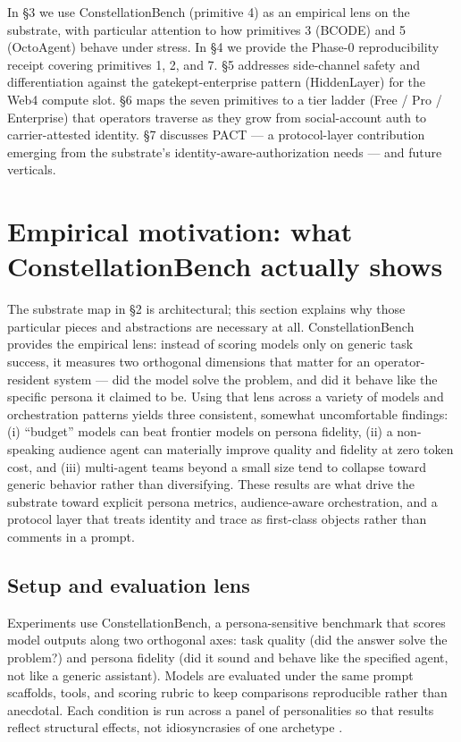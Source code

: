 \documentclass{article}
\begin{document}
In §3 we use ConstellationBench (primitive 4) as an empirical lens on
the substrate, with particular attention to how primitives 3 (BCODE) and
5 (OctoAgent) behave under stress. In §4 we provide the Phase-0
reproducibility receipt covering primitives 1, 2, and 7. §5 addresses
side-channel safety and differentiation against the gatekept-enterprise
pattern (HiddenLayer) for the Web4 compute slot. §6 maps the seven
primitives to a tier ladder (Free / Pro / Enterprise) that operators
traverse as they grow from social-account auth to carrier-attested
identity. §7 discusses PACT --- a protocol-layer contribution emerging
from the substrate's identity-aware-authorization needs --- and future
verticals.

\section{Empirical motivation: what ConstellationBench actually
shows}\label{empirical-motivation-what-constellationbench-actually-shows}

The substrate map in §2 is architectural; this section explains why
those particular pieces and abstractions are necessary at all.
ConstellationBench provides the empirical lens: instead of scoring
models only on generic task success, it measures two orthogonal
dimensions that matter for an operator-resident system --- did the model
solve the problem, and did it behave like the specific persona it
claimed to be. Using that lens across a variety of models and
orchestration patterns yields three consistent, somewhat uncomfortable
findings: (i) ``budget'' models can beat frontier models on persona
fidelity, (ii) a non-speaking audience agent can materially improve
quality and fidelity at zero token cost, and (iii) multi-agent teams
beyond a small size tend to collapse toward generic behavior rather than
diversifying. These results are what drive the substrate toward explicit
persona metrics, audience-aware orchestration, and a protocol layer that
treats identity and trace as first-class objects rather than comments in
a prompt.

\subsection{Setup and evaluation
lens}\label{setup-and-evaluation-lens}

Experiments use ConstellationBench, a persona-sensitive benchmark that
scores model outputs along two orthogonal axes: task quality (did the
answer solve the problem?) and persona fidelity (did it sound and behave
like the specified agent, not like a generic assistant). Models are
evaluated under the same prompt scaffolds, tools, and scoring rubric to
keep comparisons reproducible rather than anecdotal. Each condition is
run across a panel of personalities so that results reflect structural
effects, not idiosyncrasies of one archetype
\citep{constellationbench2026}.
\end{document}
